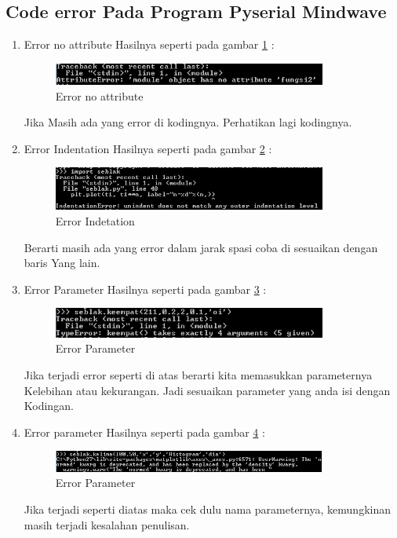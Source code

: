 \subsection{Code error Pada Program Pyserial Mindwave}
\begin{enumerate}
\item Error no attribute
Hasilnya seperti pada gambar \ref{fig:errorna} :
\begin{figure}[!htbp]
	\centerline{\includegraphics[width=0.85\textwidth]{figures/4/errorna.PNG}}
	\caption{Error no attribute}
	\label{fig:errorna}
\end{figure}
Jika Masih ada yang error di kodingnya. Perhatikan lagi kodingnya.

\item Error Indentation
Hasilnya seperti pada gambar \ref{fig:errori} :
\begin{figure}[!htbp]
	\centerline{\includegraphics[width=0.85\textwidth]{figures/4/errori.PNG}}
	\caption{Error Indetation}
	\label{fig:errori}
\end{figure}
Berarti masih ada yang error dalam jarak spasi coba di sesuaikan dengan baris
Yang lain.

\item Error Parameter
Hasilnya seperti pada gambar \ref{fig:errorp1} :
\begin{figure}[!htbp]
	\centerline{\includegraphics[width=0.85\textwidth]{figures/4/errorp1.PNG}}
	\caption{Error Parameter}
	\label{fig:errorp1}
\end{figure}
Jika terjadi error seperti di atas berarti kita memasukkan parameternya
Kelebihan  atau kekurangan. Jadi sesuaikan parameter yang anda isi dengan
Kodingan.

\item Error parameter 
Hasilnya seperti pada gambar \ref{fig:errorp2} :
\begin{figure}[!htbp]
	\centerline{\includegraphics[width=0.85\textwidth]{figures/4/errorp2.PNG}}
	\caption{Error Parameter}
	\label{fig:errorp2}
\end{figure}
Jika terjadi seperti diatas maka cek dulu nama parameternya, kemungkinan masih terjadi   kesalahan penulisan.


\end{enumerate}
